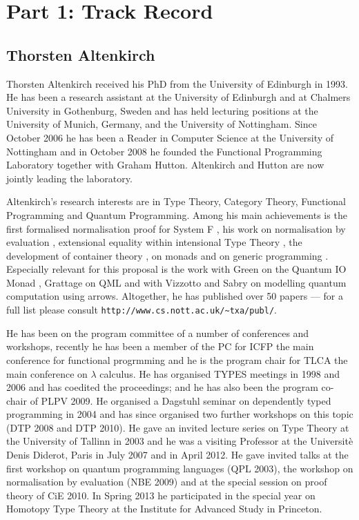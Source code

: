 \documentclass[a4paper]{article}
\begin{document}
%


\section*{Part 1: Track Record}

\subsection*{Thorsten Altenkirch}
Thorsten Altenkirch received his PhD from the University of
Edinburgh in 1993. He has been a research assistant at the University of
Edinburgh and at Chalmers University in Gothenburg, Sweden and has
held lecturing positions at the University of Munich, Germany, and the
University of Nottingham. Since October 2006 he has been a Reader in
Computer Science at the University of Nottingham and in October
2008 he founded the Functional Programming Laboratory together with
Graham Hutton. Altenkirch and Hutton are now jointly leading the
laboratory.

Altenkirch's research interests are in Type Theory, Category Theory, Functional
Programming and Quantum Programming. 
Among his main achievements is
the first formalised normalisation proof for System F
, his work on normalisation by evaluation 
, extensional equality within intensional Type Theory 
, the development of container theory %
, on
monads  
and on generic programming 
.
Especially relevant for this proposal is the
work with Green on the Quantum IO Monad 
, Grattage on QML  and with Vizzotto and Sabry on
modelling quantum computation  using
arrows. Altogether, he has published over 50 papers --- for a full list please
consult \texttt{http://www.cs.nott.ac.uk/\~{}txa/publ/}.

He has been on the program committee of a number of conferences and
workshops, recently he has been a member of the PC for ICFP the main
conference for functional progrmming and he is the program chair for
TLCA the main conference on $\lambda$ calculus.  He has organised
TYPES meetings in 1998 and 2006 and has coedited the proceedings; and
he has also been the program co-chair of PLPV 2009.  He organised a
Dagstuhl seminar on dependently typed programming in 2004 and has
since organised two further workshops on this topic (DTP 2008 and DTP
2010). He gave an invited lecture series on Type Theory at the
University of Tallinn in 2003 and he was a visiting Professor at the
Universit\`{e} Denis Diderot, Paris in July 2007 and in April 2012. He
gave invited talks at the first workshop on quantum programming
languages (QPL 2003), the workshop on normalisation by evaluation (NBE
2009) and at the special session on proof theory of CiE 2010. In
Spring 2013 he participated in the special year on Homotopy Type
Theory at the Institute for Advanced Study in Princeton.
\end{document}
